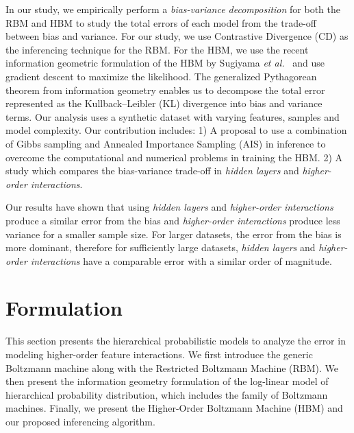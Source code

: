\documentclass[letterpaper]{article} %
\begin{document}
	In our study, we empirically perform a \textit{bias-variance decomposition} for both the RBM and HBM to study the total errors of each model from the trade-off between bias and variance. For our study, we use Contrastive Divergence (CD) as the inferencing technique for the RBM. For the HBM, we use the recent information geometric formulation of the HBM by Sugiyama \textit{et al.}~\cite{sugiyama2016information,sugiyama2017tensor} and use gradient descent to maximize the likelihood. The generalized Pythagorean theorem from information geometry enables us to decompose the total error represented as the Kullback--Leibler (KL) divergence into bias and variance terms. Our analysis uses a synthetic dataset with varying features, samples and model complexity. Our contribution includes: 1) A proposal to use a combination of Gibbs sampling and Annealed Importance Sampling (AIS) in inference to overcome the computational and numerical problems in training the HBM. 2) A study which compares the bias-variance trade-off in \textit{hidden layers} and \textit{higher-order interactions}.

	Our results have shown that using \textit{hidden layers} and \textit{higher-order interactions} produce a similar error from the bias and \textit{higher-order interactions} produce less variance for a smaller sample size. For larger datasets, the error from the bias is more dominant, therefore for sufficiently large datasets, \textit{hidden layers} and \textit{higher-order interactions} have a comparable error with a similar order of magnitude.

\section{Formulation} \label{sec:formulation}
	This section presents the hierarchical probabilistic models to analyze the error in modeling higher-order feature interactions. We first introduce the generic Boltzmann machine along with the Restricted Boltzmann Machine (RBM). We then present the information geometry formulation of the log-linear model of hierarchical probability distribution, which includes the family of Boltzmann machines. Finally, we present the Higher-Order Boltzmann Machine (HBM) and our proposed inferencing algorithm.
\end{document}
